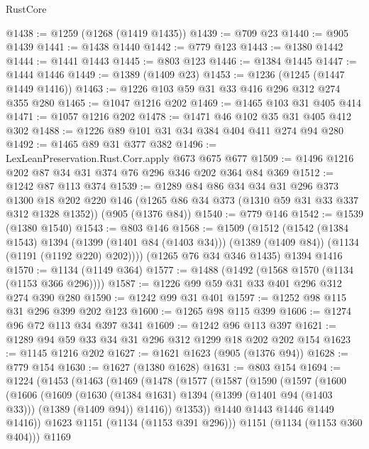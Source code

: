 \begin{lexlean}{RustCore}
\begin{coremodule}
{\begin{coremodule}
{{{{{{{{{@1438 := @1259 (@1268 (@1419 @1435))
@1439 := @709 @23
@1440 := @905 @1439
@1441 := @1438 @1440
@1442 := @779 @123
@1443 := @1380 @1442
@1444 := @1441 @1443
@1445 := @803 @123
@1446 := @1384 @1445
@1447 := @1444 @1446
@1449 := @1389 (@1409 @23)
@1453 := @1236 (@1245 (@1447 @1449 @1416))
@1463 := @1226 @103 @59 @31 @33 @416 @296 @312 @274 @355 @280
@1465 := @1047 @1216 @202
@1469 := @1465 @103 @31 @405 @414
@1471 := @1057 @1216 @202
@1478 := @1471 @46 @102 @35 @31 @405 @412 @302
@1488 := @1226 @89 @101 @31 @34 @384 @404 @411 @274 @94 @280
@1492 := @1465 @89 @31 @377 @382
@1496 := LexLeanPreservation.Rust.Corr.apply @673 @675 @677
@1509 := @1496 @1216 @202 @87 @34 @31 @374 @76 @296 @346 @202 @364 @84 @369
@1512 := @1242 @87 @113 @374
@1539 := @1289
    @84
    @86
    @34
    @34
    @31
    @296
    @373
    @1300
    @18
    @202
    @220
    @146
    (@1265 @86 @34 @373 (@1310 @59 @31 @33 @337 @312 @1328 @1352))
    (@905 (@1376 @84))
@1540 := @779 @146
@1542 := @1539 (@1380 @1540)
@1543 := @803 @146
@1568 := @1509
    (@1512
      (@1542
        (@1384 @1543)
        @1394
        (@1399 (@1401 @84 (@1403 @34)))
        (@1389 (@1409 @84))
        (@1134 (@1191 (@1192 @220) @202))))
    (@1265 @76 @34 @346 @1435)
    @1394
    @1416
@1570 := @1134 (@1149 @364)
@1577 := @1488 (@1492 (@1568 @1570 (@1134 (@1153 @366 @296))))
@1587 := @1226 @99 @59 @31 @33 @401 @296 @312 @274 @390 @280
@1590 := @1242 @99 @31 @401
@1597 := @1252 @98 @115 @31 @296 @399 @202 @123
@1600 := @1265 @98 @115 @399
@1606 := @1274 @96 @72 @113 @34 @397 @341
@1609 := @1242 @96 @113 @397
@1621 := @1289 @94 @59 @33 @34 @31 @296 @312 @1299 @18 @202 @202 @154
@1623 := @1145 @1216 @202
@1627 := @1621 @1623 (@905 (@1376 @94))
@1628 := @779 @154
@1630 := @1627 (@1380 @1628)
@1631 := @803 @154
@1694 := @1224
    (@1453
      (@1463
        (@1469
          (@1478
            (@1577
              (@1587
                (@1590
                  (@1597
                    (@1600
                      (@1606
                        (@1609
                          (@1630
                            (@1384 @1631)
                            @1394
                            (@1399 (@1401 @94 (@1403 @33)))
                            (@1389 (@1409 @94))
                            @1416))
                        @1353))
                    @1440
                    @1443
                    @1446
                    @1449
                    @1416))
                @1623
                @1151
                (@1134 (@1153 @391 @296)))
              @1151
              (@1134 (@1153 @360 @404)))
            @1169
}}}}}}}}}
\end{coremodule}}
\end{coremodule}
\end{lexlean}
